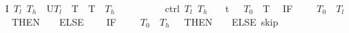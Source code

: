 \documentclass[envcountsame,envcountsect]{llncs}
\begin{document}
\begin{example}
\begin{isabellebody}

\isanewline
{}\ 
{\isachardoublequoteopen}I\ $T_l$\ $T_h$\ {\isasymequiv}\ U{\isacharparenleft}$T_l$\ {\isasymle}\ T\ {\isasymand}\ T\ {\isasymle}\ $T_h$\ {\isasymand}\ {\isacharparenleft}{\isasymtheta}\ {\isacharequal}\ {}\ {\isasymor}\ {\isasymtheta}\ {\isacharequal}\ {}{\isacharparenright}{\isacharparenright}{\isachardoublequoteclose}\isanewline
\isanewline
{}\ %
{\isachardoublequoteopen}ctrl\ $T_l$\ $T_h$\ {\isasymequiv}\isanewline 
\ \ {\isacharparenleft}t\ {\isacharcolon}{\isacharcolon}{\isacharequal}\ {}{\isacharparenright}{\isacharsemicolon}\ {\isacharparenleft}$T_0$\ {\isacharcolon}{\isacharcolon}{\isacharequal}\ T{\isacharparenright}{\isacharsemicolon}\isanewline
\ \ {\isacharparenleft}IF\ {\isacharparenleft}{\isasymtheta}\ {\isacharequal}\ {\isadigit{0}}\ {\isasymand}\ $T_0$\ {\isasymle}\ $T_l$\ {\isacharplus}\ {}{\isacharparenright}\ THEN\ {\isacharparenleft}{\isasymtheta}\ {\isacharcolon}{\isacharcolon}{\isacharequal}\ {}{\isacharparenright}\ ELSE\ \isanewline
\ \ \ IF\ {\isacharparenleft}{\isasymtheta}\ {\isacharequal}\ {\isadigit{1}}\ {\isasymand}\ $T_0$\ {\isasymge}\ $T_h$\ {\isacharminus}\ {\isadigit{1}}{\isacharparenright}\ THEN\ {\isacharparenleft}{\isasymtheta}\ {\isacharcolon}{\isacharcolon}{\isacharequal}\ {\isadigit{0}}{\isacharparenright}\ ELSE\ skip{\isacharparenright}{\isachardoublequoteclose}\isanewline
\isanewline
{}\ %

\end{isabellebody}
\end{example}
\end{document}
